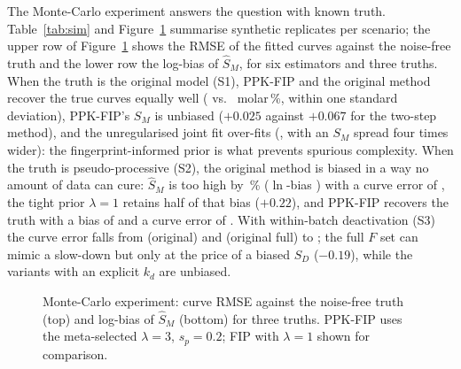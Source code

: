 The Monte-Carlo experiment answers the question with known truth. Table~\ref{tab:sim} and Figure~\ref{fig:sim} summarise \NSimReps{} synthetic replicates per scenario; the upper row of Figure~\ref{fig:sim} shows the RMSE of the fitted curves against the noise-free truth and the lower row the log-bias of $\hat S_M$, for six estimators and three truths. When the truth is the original model (S1), PPK-FIP and the original method recover the true curves equally well (\SimSiNew{} vs.\ \SimSiOrig{} molar\,\%, within one standard deviation), PPK-FIP's $S_M$ is unbiased ($+0.025$ against $+0.067$ for the two-step method), and the unregularised joint fit over-fits (\SimSiJoint, with an $S_M$ spread four times wider): the fingerprint-informed prior is what prevents spurious complexity. When the truth is pseudo-processive (S2), the original method is biased in a way no amount of data can cure: $\hat S_M$ is too high by \SimSMBiasOrigPct\,\% ($\ln$-bias \SimSMBiasOrig) with a curve error of \SimSiiOrig, the tight prior $\lambda=1$ retains half of that bias ($+0.22$), and PPK-FIP recovers the truth with a bias of \SimSMBiasNew{} and a curve error of \SimSiiNew. With within-batch deactivation (S3) the curve error falls from \SimSiiiOrig{} (original) and \SimSiiiFull{} (original full) to \SimSiiiNew; the full $F$ set can mimic a slow-down but only at the price of a biased $S_D$ ($-0.19$), while the variants with an explicit $k_d$ are unbiased.
\begin{figure}[!htbp]\centering{}\caption{Monte-Carlo experiment: curve RMSE against the noise-free truth (top) and log-bias of $\hat S_M$ (bottom) for three truths. PPK-FIP uses the meta-selected $\lambda=3$, $s_p=0.2$; FIP with $\lambda=1$ shown for comparison.}\label{fig:sim}\end{figure}



